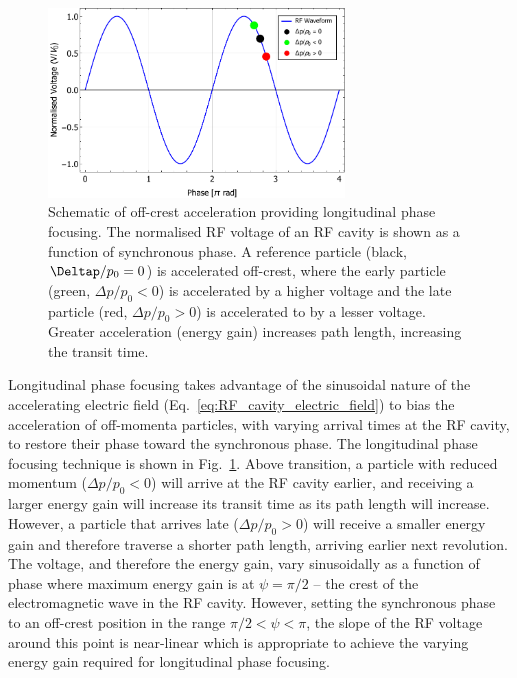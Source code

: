 \documentclass[../main.tex]{subfiles}
\begin{document}
\begin{figure}[!h]
\centering
\includegraphics[width=0.7\textwidth]{Figures/Energy_Recovery_Linac_Design/Above_Transition_Phase_Focusing.pdf}
\caption{Schematic of off-crest acceleration providing longitudinal phase focusing. The normalised RF voltage of an RF cavity is shown as a function of synchronous phase. A reference particle (black, $\Deltap/p_{0}=0$) is accelerated off-crest, where the early particle (green, $\Delta p/p_{0}<0$) is accelerated by a higher voltage and the late particle (red, $\Delta p/p_{0}>0$) is accelerated to by a lesser voltage. Greater acceleration (energy gain) increases path length, increasing the transit time. }
\label{fig:phase_focusing_above_transition}
\end{figure}

Longitudinal phase focusing takes advantage of the sinusoidal nature of the accelerating electric field (Eq.~\ref{eq:RF_cavity_electric_field}) to bias the acceleration of off-momenta particles, with varying arrival times at the RF cavity, to restore their phase toward the synchronous phase. The longitudinal phase focusing technique is shown in Fig.~\ref{fig:phase_focusing_above_transition}. Above transition, a particle with reduced momentum ($\Delta p/p_{0}<0$) will arrive at the RF cavity earlier, and receiving a larger energy gain will increase its transit time  as its path length will increase. However, a particle that arrives late ($\Delta p/p_{0}>0$) will receive a smaller energy gain and therefore traverse a shorter path length, arriving earlier next revolution.
The voltage, and therefore the energy gain, vary sinusoidally as a function of phase where maximum energy gain is at $\psi=\pi/2$ -- the crest of the electromagnetic wave in the RF cavity. However, setting the synchronous phase to an off-crest position in the range $\pi/2<\psi<\pi$, the slope of the RF voltage around this point is near-linear which is appropriate to achieve the varying energy gain required for longitudinal phase focusing.  
\end{document}
